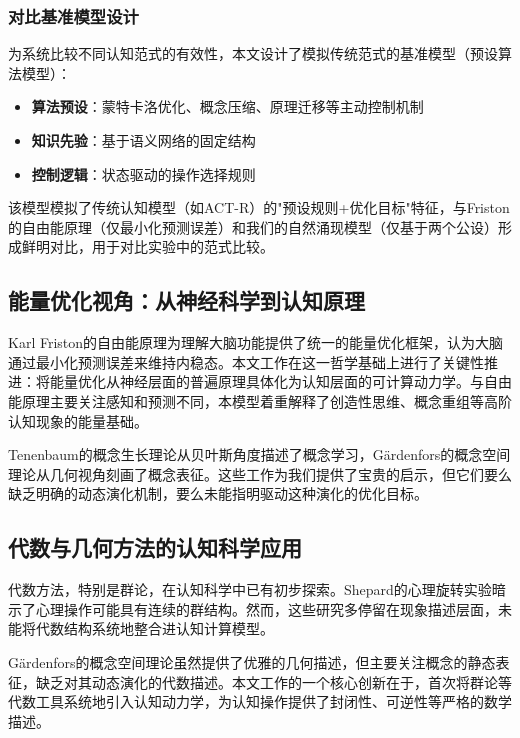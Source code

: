 \documentclass[12pt,a4paper]{article}
\begin{document}
\subsubsection{对比基准模型设计}
\label{subsec:benchmark_model}

为系统比较不同认知范式的有效性，本文设计了模拟传统范式的基准模型（预设算法模型）：
\begin{itemize}
\item \textbf{算法预设}：蒙特卡洛优化、概念压缩、原理迁移等主动控制机制
\item \textbf{知识先验}：基于语义网络的固定结构
\item \textbf{控制逻辑}：状态驱动的操作选择规则
\end{itemize}

该模型模拟了传统认知模型（如ACT-R）的"预设规则+优化目标"特征，与Friston的自由能原理（仅最小化预测误差）和我们的自然涌现模型（仅基于两个公设）形成鲜明对比，用于对比实验中的范式比较。

\subsection{能量优化视角：从神经科学到认知原理}

Karl Friston的自由能原理\cite{friston2010free}为理解大脑功能提供了统一的能量优化框架，认为大脑通过最小化预测误差来维持内稳态。本文工作在这一哲学基础上进行了关键性推进：将能量优化从神经层面的普遍原理具体化为认知层面的可计算动力学。与自由能原理主要关注感知和预测不同，本模型着重解释了创造性思维、概念重组等高阶认知现象的能量基础。

Tenenbaum的概念生长理论\cite{tenenbaum2011grow}从贝叶斯角度描述了概念学习，Gärdenfors的概念空间理论\cite{gardenfors2004conceptual}从几何视角刻画了概念表征。这些工作为我们提供了宝贵的启示，但它们要么缺乏明确的动态演化机制，要么未能指明驱动这种演化的优化目标。

\subsection{代数与几何方法的认知科学应用}

代数方法，特别是群论\cite{rotman1995theory}，在认知科学中已有初步探索。Shepard的心理旋转实验暗示了心理操作可能具有连续的群结构。然而，这些研究多停留在现象描述层面，未能将代数结构系统地整合进认知计算模型。

Gärdenfors的概念空间理论虽然提供了优雅的几何描述，但主要关注概念的静态表征，缺乏对其动态演化的代数描述。本文工作的一个核心创新在于，首次将群论等代数工具系统地引入认知动力学，为认知操作提供了封闭性、可逆性等严格的数学描述。
\end{document}
